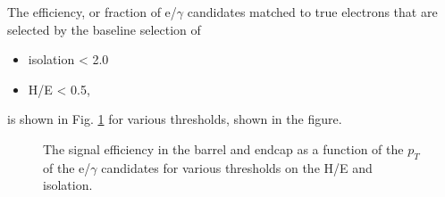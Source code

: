 The efficiency, or fraction of e/$\gamma$ candidates matched to true electrons that are selected by the baseline selection of 
\begin{itemize}
\item isolation < 2.0
\item H/E < 0.5,
\end{itemize}
is shown in Fig. \ref{fig:EGammaEfficiencies} for various thresholds, shown in the figure.
\begin{figure}[h]
\caption{The signal efficiency in the barrel and endcap as a function of the $p_T$ of the e/$\gamma$ candidates for various thresholds on the H/E and isolation.} 
\label{fig:EGammaEfficiencies}
\end{figure}
\FloatBarrier

